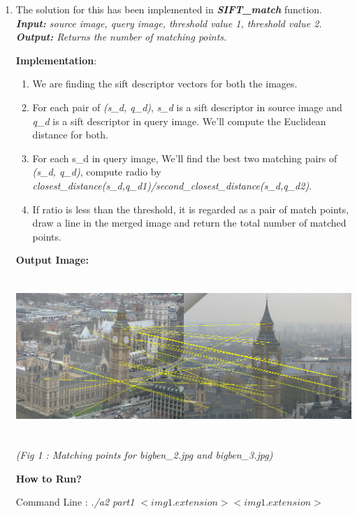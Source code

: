 \documentclass{article}
\begin{document}
	\begin{enumerate}
		\item
		
		The solution for this has been implemented in \textbf{\textit{SIFT\_match}} function. \\
		\textit{\textbf{Input:} source image, query image, threshold value 1, threshold value 2. \\
		\textbf{Output:} Returns the number of matching points.}
	
		\textbf{Implementation}:
		\begin{enumerate}
			\item We are finding the sift descriptor vectors for both the images.
			\item  For each pair of \textit{(s\_d, q\_d)}, \textit{s\_d} is a sift descriptor in source image and \textit{q\_d} is a sift descriptor in query image. We'll compute the Euclidean distance for both.
		\item  For each s\_d in query image, We'll find the best two matching pairs of \textit{(s\_d, q\_d)}, compute radio by \textit{closest\_distance\textit{(s\_d,q\_d1)}/second\_closest\_distance\textit{(s\_d,q\_d2)}}.
		\item If ratio is less than the threshold, it is regarded as a pair of match points, draw a line in the merged image and return the total number of matched points.
		\end{enumerate}
		
		\textbf{Output Image:}
		
		\includegraphics[height=6cm,width=16cm]{1}
		\begin{center}
			\textit{	(Fig 1 : Matching points for bigben\_2.jpg and bigben\_3.jpg)}
		\end{center}
	
		
		\textbf{How to Run?}
		
		Command Line : \textit{./a2 part1 $<img1.extension>  <img1.extension>$}
		

\end{enumerate}
\end{document}
